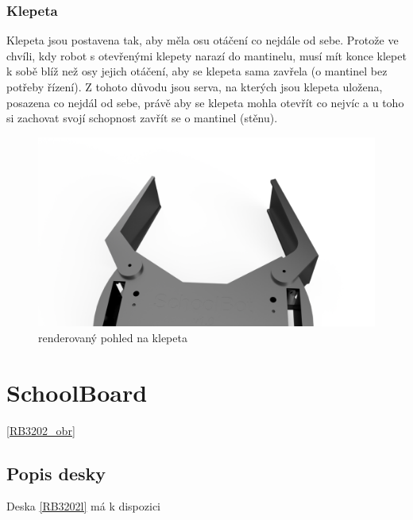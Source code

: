 \documentclass{template/socthesis}
\begin{document}
\subsection{Klepeta}
Klepeta jsou postavena tak, aby měla osu otáčení co nejdále od sebe. Protože ve chvíli, kdy robot s otevřenými klepety narazí do mantinelu, musí mít konce klepet k sobě blíž než osy jejich otáčení, aby se klepeta sama zavřela (o mantinel bez potřeby řízení). Z tohoto důvodu jsou serva, na kterých jsou klepeta uložena, posazena co nejdál od sebe, právě aby se klepeta mohla otevřít co nejvíc a u toho si zachovat svojí schopnost zavřít se o mantinel (stěnu).
\begin{figure}[h]
	\centering
	\includegraphics[width=\textwidth]{img/klepeta.png}
	\caption{renderovaný pohled na klepeta}
\end{figure}



\chapter{SchoolBoard}\label{RB3202}

\ref{RB3202_obr}



\section{Popis desky}

Deska \ref{RB3202l} %
má k dispozici
\end{document}
